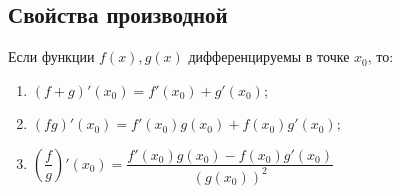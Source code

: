 \subsection{Свойства производной}

\begin{theorem}\label{ariph_for_der}
    Если функции $f(x), g(x)$ дифференцируемы в точке $x_0$, то:
    \begin{enumerate}
        \item $(f+g)'(x_0) = f'(x_0) + g'(x_0)$;
        \item $(fg)'(x_0) = f'(x_0) g(x_0) + f(x_0) g'(x_0);$
        \item $\left( \dfrac{f}{g} \right)'(x_0) = \dfrac{f'(x_0)g(x_0) - f(x_0) g'(x_0)}{(g(x_0))^2}$
    \end{enumerate}
\end{theorem}
